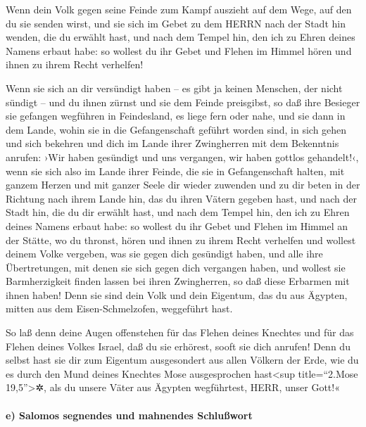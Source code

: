 Wenn dein Volk gegen seine Feinde zum Kampf auszieht auf
dem Wege, auf den du sie senden wirst, und sie sich im Gebet zu dem
HERRN nach der Stadt hin wenden, die du erwählt hast, und nach dem
Tempel hin, den ich zu Ehren deines Namens erbaut habe:
so wollest du ihr Gebet und Flehen im Himmel hören und
ihnen zu ihrem Recht verhelfen!

Wenn sie sich an dir versündigt haben -- es gibt ja
keinen Menschen, der nicht sündigt -- und du ihnen zürnst und sie dem
Feinde preisgibst, so daß ihre Besieger sie gefangen wegführen in
Feindesland, es liege fern oder nahe, und sie dann in dem
Lande, wohin sie in die Gefangenschaft geführt worden sind, in sich
gehen und sich bekehren und dich im Lande ihrer Zwingherren mit dem
Bekenntnis anrufen: ›Wir haben gesündigt und uns vergangen, wir haben
gottlos gehandelt!‹, wenn sie sich also im Lande ihrer
Feinde, die sie in Gefangenschaft halten, mit ganzem Herzen und mit
ganzer Seele dir wieder zuwenden und zu dir beten in der Richtung nach
ihrem Lande hin, das du ihren Vätern gegeben hast, und nach der Stadt
hin, die du dir erwählt hast, und nach dem Tempel hin, den ich zu Ehren
deines Namens erbaut habe: so wollest du ihr Gebet und
Flehen im Himmel an der Stätte, wo du thronst, hören und ihnen zu ihrem
Recht verhelfen und wollest deinem Volke vergeben, was
sie gegen dich gesündigt haben, und alle ihre Übertretungen, mit denen
sie sich gegen dich vergangen haben, und wollest sie Barmherzigkeit
finden lassen bei ihren Zwingherren, so daß diese Erbarmen mit ihnen
haben! Denn sie sind dein Volk und dein Eigentum, das du
aus Ägypten, mitten aus dem Eisen-Schmelzofen, weggeführt hast.

So laß denn deine Augen offenstehen für das Flehen deines
Knechtes und für das Flehen deines Volkes Israel, daß du sie erhörest,
sooft sie dich anrufen! Denn du selbst hast sie dir zum
Eigentum ausgesondert aus allen Völkern der Erde, wie du es durch den
Mund deines Knechtes Mose ausgesprochen hast\textless sup title=``2.Mose
19,5''\textgreater✲, als du unsere Väter aus Ägypten wegführtest, HERR,
unser Gott!«

\hypertarget{e-salomos-segnendes-und-mahnendes-schluuxdfwort}{%
\paragraph{e) Salomos segnendes und mahnendes
Schlußwort}\label{e-salomos-segnendes-und-mahnendes-schluuxdfwort}}

